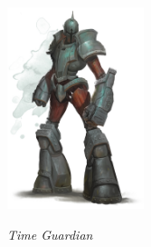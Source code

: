 \begin{center}
	\includegraphics[width = 0.3\textwidth]{time-guardian}
	
	\emph{Time Guardian}
\end{center}